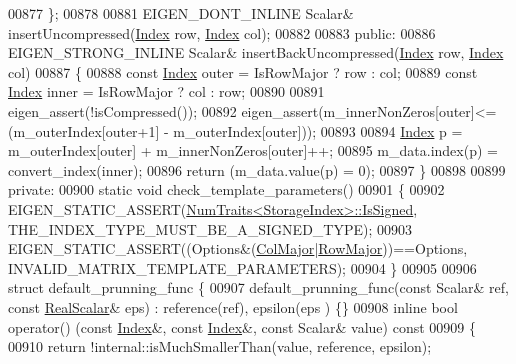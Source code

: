 \begin{DoxyCode}
00877     \};
00878 
00881     EIGEN\_DONT\_INLINE Scalar& insertUncompressed(\hyperlink{group___core___module_a554f30542cc2316add4b1ea0a492ff02}{Index} row, \hyperlink{group___core___module_a554f30542cc2316add4b1ea0a492ff02}{Index} col);
00882 
00883 \textcolor{keyword}{public}:
00886     EIGEN\_STRONG\_INLINE Scalar& insertBackUncompressed(\hyperlink{group___core___module_a554f30542cc2316add4b1ea0a492ff02}{Index} row, \hyperlink{group___core___module_a554f30542cc2316add4b1ea0a492ff02}{Index} col)
00887     \{
00888       \textcolor{keyword}{const} \hyperlink{group___core___module_a554f30542cc2316add4b1ea0a492ff02}{Index} outer = IsRowMajor ? row : col;
00889       \textcolor{keyword}{const} \hyperlink{group___core___module_a554f30542cc2316add4b1ea0a492ff02}{Index} inner = IsRowMajor ? col : row;
00890 
00891       eigen\_assert(!isCompressed());
00892       eigen\_assert(m\_innerNonZeros[outer]<=(m\_outerIndex[outer+1] - m\_outerIndex[outer]));
00893 
00894       \hyperlink{group___core___module_a554f30542cc2316add4b1ea0a492ff02}{Index} p = m\_outerIndex[outer] + m\_innerNonZeros[outer]++;
00895       m\_data.index(p) = convert\_index(inner);
00896       \textcolor{keywordflow}{return} (m\_data.value(p) = 0);
00897     \}
00898 
00899 \textcolor{keyword}{private}:
00900   \textcolor{keyword}{static} \textcolor{keywordtype}{void} check\_template\_parameters()
00901   \{
00902     EIGEN\_STATIC\_ASSERT(\hyperlink{group___core___module_struct_eigen_1_1_num_traits}{NumTraits<StorageIndex>::IsSigned},
      THE\_INDEX\_TYPE\_MUST\_BE\_A\_SIGNED\_TYPE);
00903     EIGEN\_STATIC\_ASSERT((Options&(\hyperlink{group__enums_ggaacded1a18ae58b0f554751f6cdf9eb13a0cbd4bdd0abcfc0224c5fcb5e4f6669a}{ColMajor}|\hyperlink{group__enums_ggaacded1a18ae58b0f554751f6cdf9eb13acfcde9cd8677c5f7caf6bd603666aae3}{RowMajor}))==Options,
      INVALID\_MATRIX\_TEMPLATE\_PARAMETERS);
00904   \}
00905 
00906   \textcolor{keyword}{struct }default\_prunning\_func \{
00907     default\_prunning\_func(\textcolor{keyword}{const} Scalar& ref, \textcolor{keyword}{const} \hyperlink{group___sparse_core___module_aaec8ace6efb785c81d442931c3248d88}{RealScalar}& eps) : reference(ref), epsilon(eps
      ) \{\}
00908     \textcolor{keyword}{inline} \textcolor{keywordtype}{bool} operator() (\textcolor{keyword}{const} \hyperlink{group___core___module_a554f30542cc2316add4b1ea0a492ff02}{Index}&, \textcolor{keyword}{const} \hyperlink{group___core___module_a554f30542cc2316add4b1ea0a492ff02}{Index}&, \textcolor{keyword}{const} Scalar& value)\textcolor{keyword}{ const}
00909 \textcolor{keyword}{    }\{
00910       \textcolor{keywordflow}{return} !internal::isMuchSmallerThan(value, reference, epsilon);

\end{DoxyCode}
